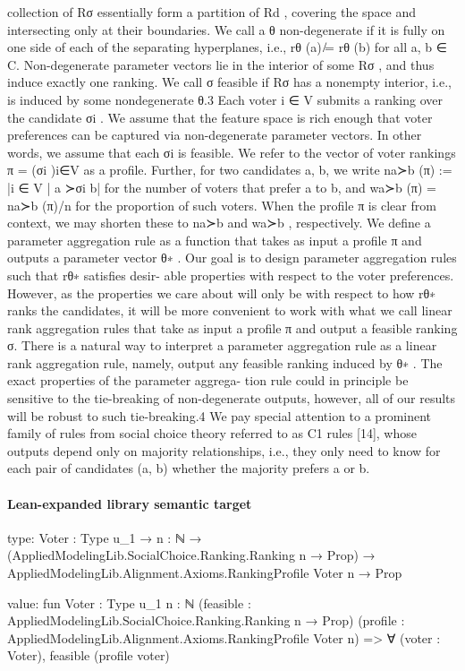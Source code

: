 \documentclass[10pt]{article}
\begin{document}
\begin{ReviewVerbatim}
collection of {Rσ } essentially form a partition of Rd , covering the space and intersecting only at
their boundaries.
We call a θ non-degenerate if it is fully on one side of each of the separating hyperplanes, i.e.,
rθ (a) ̸= rθ (b) for all a, b ∈ C. Non-degenerate parameter vectors lie in the interior of some Rσ ,
and thus induce exactly one ranking. We call σ feasible if Rσ has a nonempty interior, i.e., is induced
by some nondegenerate θ.3
Each voter i ∈ V submits a ranking over the candidate σi . We assume that the feature space is
rich enough that voter preferences can be captured via non-degenerate parameter vectors. In other
words, we assume that each σi is feasible. We refer to the vector of voter rankings π = (σi )i∈V as
a profile. Further, for two candidates a, b, we write na≻b (π) := |{i ∈ V | a ≻σi b}| for the number
of voters that prefer a to b, and wa≻b (π) = na≻b (π)/n for the proportion of such voters. When the
profile π is clear from context, we may shorten these to na≻b and wa≻b , respectively.
We define a parameter aggregation rule as a function that takes as input a profile π and outputs a
parameter vector θ∗ . Our goal is to design parameter aggregation rules such that rθ∗ satisfies desir-
able properties with respect to the voter preferences. However, as the properties we care about will
only be with respect to how rθ∗ ranks the candidates, it will be more convenient to work with what
we call linear rank aggregation rules that take as input a profile π and output a feasible ranking σ.
There is a natural way to interpret a parameter aggregation rule as a linear rank aggregation rule,
namely, output any feasible ranking induced by θ∗ . The exact properties of the parameter aggrega-
tion rule could in principle be sensitive to the tie-breaking of non-degenerate outputs, however, all
of our results will be robust to such tie-breaking.4
We pay special attention to a prominent family of rules from social choice theory referred to as C1
rules [14], whose outputs depend only on majority relationships, i.e., they only need to know for
each pair of candidates (a, b) whether the majority prefers a or b.
\end{ReviewVerbatim}



\paragraph{Lean-expanded library semantic target}
\begin{ReviewVerbatim}
type:
{Voter : Type u_1} →
  {n : ℕ} →
    (AppliedModelingLib.SocialChoice.Ranking.Ranking n → Prop) →
      AppliedModelingLib.Alignment.Axioms.RankingProfile Voter n → Prop

value:
fun {Voter : Type u_1} {n : ℕ} (feasible : AppliedModelingLib.SocialChoice.Ranking.Ranking n → Prop)
    (profile : AppliedModelingLib.Alignment.Axioms.RankingProfile Voter n) =>
  ∀ (voter : Voter), feasible (profile voter)
\end{ReviewVerbatim}
\end{document}
